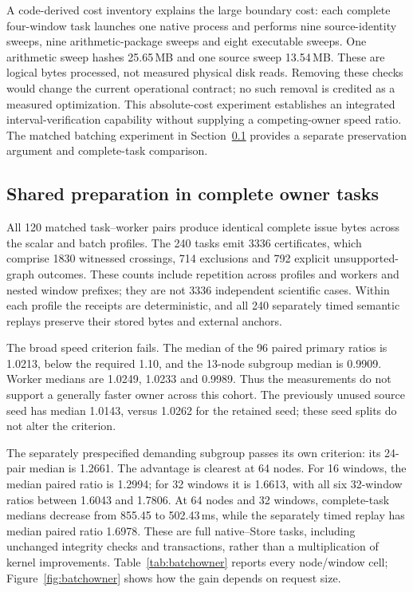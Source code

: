 \documentclass[11pt,a4paper]{article}
\theoremstyle{definition}\newtheorem{definition}[theorem]{Definition}
\begin{document}
A code-derived cost inventory explains the large boundary cost: each complete four-window task launches one native process and performs nine source-identity sweeps, nine arithmetic-package sweeps and eight executable sweeps. One arithmetic sweep hashes 25.65\,MB and one source sweep 13.54\,MB. These are logical bytes processed, not measured physical disk reads. Removing these checks would change the current operational contract; no such removal is credited as a measured optimization. This absolute-cost experiment establishes an integrated interval-verification capability without supplying a competing-owner speed ratio. The matched batching experiment in Section~\ref{sec:batchresults} provides a separate preservation argument and complete-task comparison.

\subsection{Shared preparation in complete owner tasks}\label{sec:batchresults}
All 120 matched task--worker pairs produce identical complete issue bytes across the scalar and batch profiles. The 240 tasks emit 3336 certificates, which comprise 1830 witnessed crossings, 714 exclusions and 792 explicit unsupported-graph outcomes. These counts include repetition across profiles and workers and nested window prefixes; they are not 3336 independent scientific cases. Within each profile the receipts are deterministic, and all 240 separately timed semantic replays preserve their stored bytes and external anchors.

The broad speed criterion fails. The median of the 96 paired primary ratios is 1.0213, below the required 1.10, and the 13-node subgroup median is 0.9909. Worker medians are 1.0249, 1.0233 and 0.9989. Thus the measurements do not support a generally faster owner across this cohort. The previously unused source seed has median 1.0143, versus 1.0262 for the retained seed; these seed splits do not alter the criterion.

The separately prespecified demanding subgroup passes its own criterion: its 24-pair median is 1.2661. The advantage is clearest at 64 nodes. For 16 windows, the median paired ratio is 1.2994; for 32 windows it is 1.6613, with all six 32-window ratios between 1.6043 and 1.7806. At 64 nodes and 32 windows, complete-task medians decrease from 855.45 to 502.43\,ms, while the separately timed replay has median paired ratio 1.6978. These are full native--Store tasks, including unchanged integrity checks and transactions, rather than a multiplication of kernel improvements. Table~\ref{tab:batchowner} reports every node/window cell; Figure~\ref{fig:batchowner} shows how the gain depends on request size.
\end{document}
